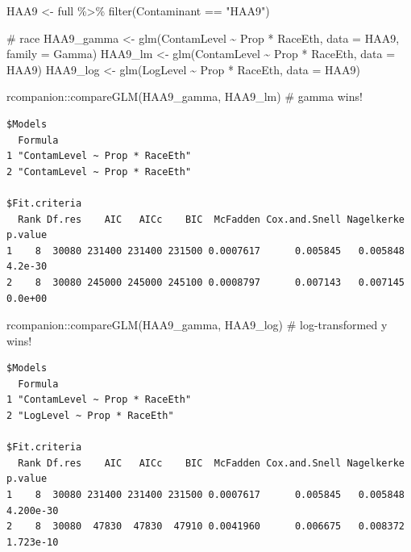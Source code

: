 \documentclass[
  letterpaper,
  DIV=11,
  numbers=noendperiod]{scrartcl}
\newenvironment{Shaded}{\begin{snugshade}}{\end{snugshade}}
\newcommand{\AttributeTok}[1]{\textcolor[rgb]{0.40,0.45,0.13}{#1}}
\newcommand{\CommentTok}[1]{\textcolor[rgb]{0.37,0.37,0.37}{#1}}
\newcommand{\FunctionTok}[1]{\textcolor[rgb]{0.28,0.35,0.67}{#1}}
\newcommand{\NormalTok}[1]{\textcolor[rgb]{0.00,0.23,0.31}{#1}}
\newcommand{\OtherTok}[1]{\textcolor[rgb]{0.00,0.23,0.31}{#1}}
\newcommand{\SpecialCharTok}[1]{\textcolor[rgb]{0.37,0.37,0.37}{#1}}
\newcommand{\StringTok}[1]{\textcolor[rgb]{0.13,0.47,0.30}{#1}}
\begin{document}
\begin{Shaded}
\begin{Highlighting}[]
\NormalTok{HAA9 }\OtherTok{\textless{}{-}}\NormalTok{ full }\SpecialCharTok{\%\textgreater{}\%} 
  \FunctionTok{filter}\NormalTok{(Contaminant }\SpecialCharTok{==} \StringTok{"HAA9"}\NormalTok{)}

\CommentTok{\# race}
\NormalTok{HAA9\_gamma }\OtherTok{\textless{}{-}} \FunctionTok{glm}\NormalTok{(ContamLevel }\SpecialCharTok{\textasciitilde{}}\NormalTok{ Prop }\SpecialCharTok{*}\NormalTok{ RaceEth, }\AttributeTok{data =}\NormalTok{ HAA9, }\AttributeTok{family =}\NormalTok{ Gamma)}
\NormalTok{HAA9\_lm }\OtherTok{\textless{}{-}} \FunctionTok{glm}\NormalTok{(ContamLevel }\SpecialCharTok{\textasciitilde{}}\NormalTok{ Prop }\SpecialCharTok{*}\NormalTok{ RaceEth, }\AttributeTok{data =}\NormalTok{ HAA9)}
\NormalTok{HAA9\_log }\OtherTok{\textless{}{-}} \FunctionTok{glm}\NormalTok{(LogLevel }\SpecialCharTok{\textasciitilde{}}\NormalTok{ Prop }\SpecialCharTok{*}\NormalTok{ RaceEth, }\AttributeTok{data =}\NormalTok{ HAA9)}

\NormalTok{rcompanion}\SpecialCharTok{::}\FunctionTok{compareGLM}\NormalTok{(HAA9\_gamma, HAA9\_lm) }\CommentTok{\# gamma wins!}
\end{Highlighting}
\end{Shaded}

\begin{verbatim}
$Models
  Formula                       
1 "ContamLevel ~ Prop * RaceEth"
2 "ContamLevel ~ Prop * RaceEth"

$Fit.criteria
  Rank Df.res    AIC   AICc    BIC  McFadden Cox.and.Snell Nagelkerke p.value
1    8  30080 231400 231400 231500 0.0007617      0.005845   0.005848 4.2e-30
2    8  30080 245000 245000 245100 0.0008797      0.007143   0.007145 0.0e+00
\end{verbatim}

\begin{Shaded}
\begin{Highlighting}[]
\NormalTok{rcompanion}\SpecialCharTok{::}\FunctionTok{compareGLM}\NormalTok{(HAA9\_gamma, HAA9\_log) }\CommentTok{\# log{-}transformed y wins!}
\end{Highlighting}
\end{Shaded}

\begin{verbatim}
$Models
  Formula                       
1 "ContamLevel ~ Prop * RaceEth"
2 "LogLevel ~ Prop * RaceEth"   

$Fit.criteria
  Rank Df.res    AIC   AICc    BIC  McFadden Cox.and.Snell Nagelkerke   p.value
1    8  30080 231400 231400 231500 0.0007617      0.005845   0.005848 4.200e-30
2    8  30080  47830  47830  47910 0.0041960      0.006675   0.008372 1.723e-10
\end{verbatim}
\end{document}
